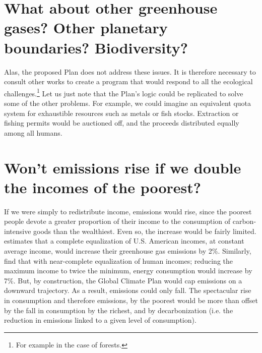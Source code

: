 \documentclass[a5paper,english,openany]{memoir}
\begin{document}
\section*{\normalsize What about other greenhouse gases? Other planetary boundaries? Biodiversity?}\label{q:scope}

Alas, the proposed Plan does not address these issues. It is therefore necessary to consult other works %
to create %
a program that would respond to all the ecological challenges.\footnote{For example \citet{strassburg_reducing_2009,karsenty_geopolitique_2021} in the case of forests.} %
Let us %
just note that the Plan's logic could be replicated to solve some of the other problems. %
For example, we could imagine an equivalent quota system for exhaustible resources such as metals or fish stocks. Extraction or fishing permits would be auctioned off, and the proceeds distributed equally among all humans.

\section*{\normalsize Won't emissions rise if we double the incomes of the poorest?}\label{q:emissions}

If we were simply to redistribute income, emissions would rise, since the poorest people devote a greater proportion of their income to the consumption of carbon-intensive goods than the wealthiest. Even so, the increase would be fairly limited. \cite{sager_income_2019} estimates that a complete equalization of U.S. American incomes, at constant average income, %
would increase their greenhouse gas emissions by 2\%. Similarly, \cite{oswald_global_2021} find that with near-complete equalization of human incomes; reducing the maximum income to twice the minimum, %
energy consumption would increase by 7\%. 
But, by construction, the Global Climate Plan would cap emissions on a downward trajectory. As a result, emissions could only fall. The spectacular rise in consumption and therefore emissions, %
by the poorest would be more than offset by the fall in consumption by the richest, and by decarbonization (i.e. the reduction in emissions linked to a given level of consumption).
\end{document}
